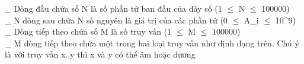 \_ Dòng đầu chứa số N là số phần tử ban đầu của dãy số (1 $\le$ N $\le$ 100000)   
\\   \_ N dòng sau chứa N số nguyên là giá trị của các phần tử (0 $\le$ A\_i $\le$ 10^9)   
\\   \_ Dòng tiếp theo chứa số M là số truy vấn (1 $\le$ M $\le$ 100000)   
\\   \_ M dòng tiếp theo chứa một trong hai loại truy vấn như định dạng trên. Chú ý là với truy vấn x..y thì x và y có thể âm hoặc dương   
\\

\